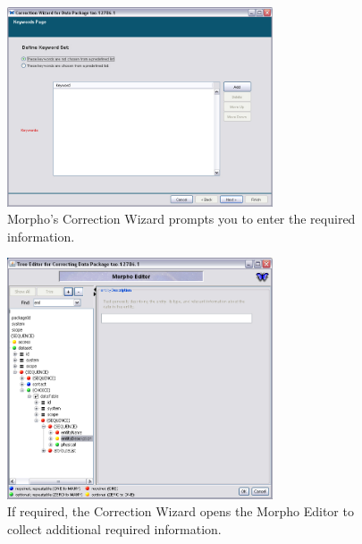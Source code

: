\begin{figure}
  \centering
    \includegraphics[width=0.7\textwidth]{images/upgrade-eml-wizard.jpg}
  \caption{Morpho's Correction Wizard prompts you to enter the required
    information.}
  \label{fig:upgrade-eml-wizard}
\end{figure}

\begin{figure}
  \centering
    \includegraphics[width=0.7\textwidth]{images/upgrade-eml-correction.jpg}
  \caption{If required, the Correction Wizard opens the Morpho Editor to
    collect additional required information.}
  \label{fig:upgrade-eml-correction}
\end{figure}

